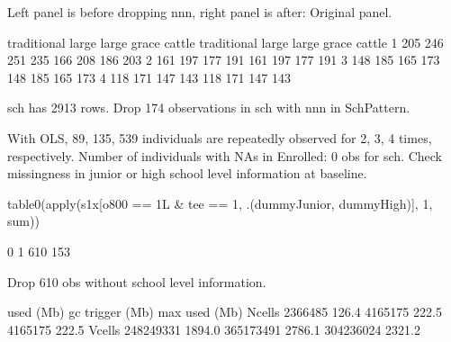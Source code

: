 Left panel is before dropping \textsf{nnn}, right panel is after: Original panel.
\begin{Schunk}
\begin{Soutput}
  traditional large large grace cattle traditional large large grace cattle
1         205   246         251    235         166   208         186    203
2         161   197         177    191         161   197         177    191
3         148   185         165    173         148   185         165    173
4         118   171         147    143         118   171         147    143
\end{Soutput}
\end{Schunk}
\textsf{sch} has 2913 rows. Drop 174 observations in \textsf{sch} with nnn in \textsf{SchPattern}. 

With OLS,  89, 135, 539 individuals are repeatedly observed for 2, 3, 4 times, respectively. %
Number of individuals with NAs in \textsf{Enrolled}: 0 obs for \textsf{sch}. 
Check missingness in junior or high school level information at baseline.
\begin{Schunk}
\begin{Sinput}
table0(apply(s1x[o800 == 1L & tee == 1, .(dummyJunior, dummyHigh)], 1, sum))
\end{Sinput}
\begin{Soutput}

  0   1 
610 153 
\end{Soutput}
\end{Schunk}
Drop 610 obs without school level information.

\begin{Schunk}
\begin{Soutput}
            used   (Mb) gc trigger   (Mb)  max used   (Mb)
Ncells   2366485  126.4    4165175  222.5   4165175  222.5
Vcells 248249331 1894.0  365173491 2786.1 304236024 2321.2
\end{Soutput}
\end{Schunk}



